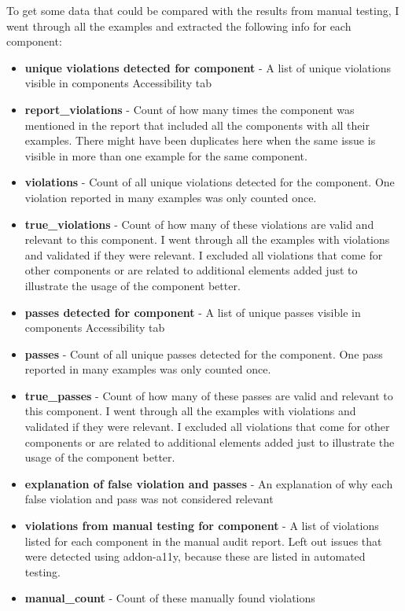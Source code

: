 \documentclass{master_thesis}
\begin{document}
To get some data that could be compared with the results from manual testing, I went through all the examples and extracted the following info for each component:
\begin{itemize}
	\item \textbf{unique violations detected for component} - A list of unique violations visible in components Accessibility tab
	\item \textbf{report\_violations} - Count of how many times the component was mentioned in the report that included all the components with all their examples. There might have been duplicates here when the same issue is visible in more than one example for the same component.
	\item \textbf{violations} - Count of all unique violations detected for the component. One violation reported in many examples was only counted once.
	\item \textbf{true\_violations} - Count of how many of these violations are valid and relevant to this component. I went through all the examples with violations and validated if they were relevant.  I excluded all violations that come for other components or are related to additional elements added just to illustrate the usage of the component better.
	\item \textbf{passes detected for component} - A list of unique passes visible in components Accessibility tab
	\item \textbf{passes} - Count of all unique passes detected for the component. One pass reported in many examples was only counted once.
	\item \textbf{true\_passes} - Count of how many of these passes are valid and relevant to this component. I went through all the examples with violations and validated if they were relevant. I excluded all violations that come for other components or are related to additional elements added just to illustrate the usage of the component better.
	\item \textbf{explanation of false violation and passes} - An explanation of why each false violation and pass was not considered relevant
	\item \textbf{violations from manual testing for component} - A list of violations listed for each component in the manual audit report. Left out issues that were detected using addon-a11y, because these are listed in automated testing.
	\item \textbf{manual\_count} - Count of these manually found violations
\end{itemize}
\end{document}
